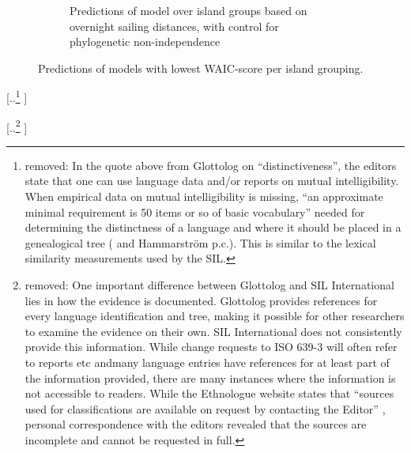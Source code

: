 \documentclass[unnumsec,webpdf,modern,medium]{oup-authoring-template}
\providecommand{\DIFaddtex}[1]{{\protect\color{blue} \sf #1}} %
\providecommand{\DIFdeltex}[1]{{\protect\color{red} [..\footnote{removed: #1} ]}} %
\providecommand{\DIFdelbegin}{} %
\providecommand{\DIFdelend}{} %
\providecommand{\DIFaddFL}[1]{\DIFadd{#1}} %
\providecommand{\DIFaddendFL}{} %
\providecommand{\DIFadd}[1]{\texorpdfstring{\DIFaddtex{#1}}{#1}} %
\providecommand{\DIFdel}[1]{\texorpdfstring{\DIFdeltex{#1}}{}} %
\newcommand{\DIFscaledelfig}{0.5}
\newlength{\DIFdelgraphicswidth} %
\newlength{\DIFdelgraphicsheight} %
\newcommand{\DIFdelincludegraphics}[2][]{%
\sbox{\DIFdelgraphicsbox}{\DIFOincludegraphics[#1]{#2}}%
\settoboxwidth{\DIFdelgraphicswidth}{\DIFdelgraphicsbox} %
\settoboxtotalheight{\DIFdelgraphicsheight}{\DIFdelgraphicsbox} %
\scalebox{\DIFscaledelfig}{%
\parbox[b]{\DIFdelgraphicswidth}{\usebox{\DIFdelgraphicsbox}\\[-\baselineskip] \rule{\DIFdelgraphicswidth}{0em}}\llap{\resizebox{\DIFdelgraphicswidth}{\DIFdelgraphicsheight}{%
\setlength{\unitlength}{\DIFdelgraphicswidth}%
\begin{picture}(1,1)%
\thicklines\linethickness{2pt} %
{\color[rgb]{1,0,0}\put(0,0){\framebox(1,1){}}}%
{\color[rgb]{1,0,0}\put(0,0){\line( 1,1){1}}}%
{\color[rgb]{1,0,0}\put(0,1){\line(1,-1){1}}}%
\end{picture}%
}\hspace*{3pt}}} %
} %
\DeclareRobustCommand{\DIFdelbegin}{\DIFOdelbegin \let\includegraphics\DIFdelincludegraphics} %
\DeclareRobustCommand{\DIFdelend}{\DIFOaddend \let\includegraphics\DIFOincludegraphics} %
\DeclareRobustCommand{\DIFaddendFL}{\DIFOaddendFL \let\includegraphics\DIFOincludegraphics} %
\begin{document}
\begin{figure}
\begin{subfigure}{0.48\textwidth}
  \caption{\DIFaddFL{Predictions of model over island groups based on overnight sailing distances, with control for phylogenetic non-independence}}
\label{SBZR_model_predict}
\end{subfigure}
\caption{\DIFaddFL{Predictions of models with lowest WAIC-score per island grouping.}}
\label{prediction_plot}
\DIFaddendFL \end{figure}

\DIFdelbegin \DIFdel{In the quote above from Glottolog on ``distinctiveness'', the editors state that one can use language data and/or reports on mutual intelligibility. When empirical data on mutual intelligibility is missing, ``an approximate minimal requirement is 50 items or so of basic vocabulary'' needed for determining the distinctness of a language and where it should be placed in a genealogical tree  (\citet{glottologlanguoids} and Hammarström p.c.). This is similar to the lexical similarity measurements used by the SIL.
}\DIFdelend %

\DIFdelbegin \DIFdel{One important difference between Glottolog and SIL International lies in how the evidence is documented. Glottolog provides references for every language identification and tree, making it possible for other researchers to examine the evidence on their own. SIL International does not consistently provide this information. While change requests to ISO 639-3 will often refer to reports etc andmany language entries have references for at least part of the information provided, there are many instances where the information is not accessible to readers. While the Ethnologue website states that ``sources used for classifications are available on request by contacting the Editor'' \citep{ethnologue2019lgident}, personal correspondence with the editors revealed that the sources are incomplete and cannot be requested in full.
}%
\end{document}
